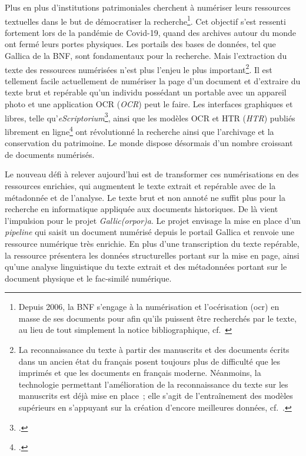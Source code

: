 \documentclass[class=article, crop=false]{standalone}
\begin{document}
Plus en plus d'institutions patrimoniales cherchent à numériser leurs ressources textuelles dans le but de démocratiser la recherche\footnote{Depuis 2006, la \acrlong{BNF} s'engage à la numérisation et l'océrisation (\Gls{ocr}) en masse de ses documents pour afin qu'ils puissent être recherchés par le texte, au lieu de tout simplement la notice bibliographique, cf.~\cite{salahAdaptiveDetectionMissed2013}}. Cet objectif s'est ressenti fortement lors de la pandémie de Covid-19, quand des archives autour du monde ont fermé leurs portes physiques. Les portails des bases de données, tel que Gallica de la \acrlong{BNF}, sont fondamentaux pour la recherche. Mais l'extraction du texte des ressources numérisées n'est plus l'enjeu le plus important\footnote{La reconnaissance du texte à partir des manuscrits et des documents écrits dans un ancien état du français posent toujours plus de difficulté que les imprimés et que les documents en français moderne. Néanmoins, la technologie permettant l'amélioration de la reconnaissance du texte sur les manuscrits est déjà mise en place~; elle s'agit de l'entraînement des modèles supérieurs en s'appuyant sur la création d'encore meilleures données, cf.~\cite{gabayOCR17GroundTruth2020}.}. 
Il est tellement facile actuellement de numériser la page d'un document et d'extraire du texte brut et repérable qu'un individu possédant un portable avec un appareil photo et une application \acrshort{OCR} (\textit{\acrlong{OCR}}) peut le faire. Les interfaces graphiques et libres, telle qu'\textit{eScriptorium}\footcite{gautierCompterenduJourneeEtude2022}, ainsi que les modèles \acrshort{OCR} et \acrshort{HTR} (\textit{\acrlong{HTR}}) publiés librement en ligne\footcite{ModelsHuggingFace} ont révolutionné la recherche ainsi que l'archivage et la conservation du patrimoine. Le monde dispose désormais d'un nombre croissant de documents numérisés.

Le nouveau défi à relever aujourd'hui est de transformer ces numérisations en des ressources enrichies, qui augmentent le texte extrait et repérable avec de la métadonnée et de l'analyse. Le texte brut et non annoté ne suffit plus pour la recherche en informatique appliquée aux documents historiques. De là vient l'impulsion pour le projet \textit{Gallic(orpor)a}. Le projet envisage la mise en place d'un \textit{pipeline} qui saisit un document numérisé depuis le portail Gallica et renvoie une ressource numérique très enrichie. En plus d'une transcription du texte repérable, la ressource présentera les données structurelles portant sur la mise en page, ainsi qu'une analyse linguistique du texte extrait et des métadonnées portant sur le document physique et le fac-similé numérique.
\end{document}
